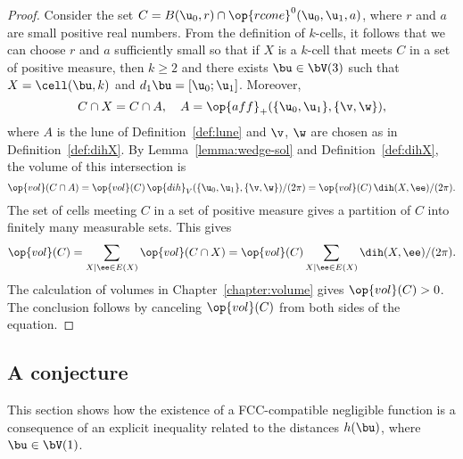 \begin{proof} 
  Consider the set $C=B(\u_0,r)\cap \op{rcone}^0(\u_0,\u_1,a)$, where
  $r$ and $a$ are small positive real numbers.  From the definition of
  $k$-cells, it follows that we can choose $r$ and $a$ sufficiently
  small so that if $X$ is a $k$-cell that meets $C$ in a set of
  positive measure, then $k\ge 2$ and there exists $\bu\in \bV(3)$
  such that $X=\cell(\bu,k)$ and $d_1\bu=[\u_0;\u_1]$.  Moreover,
\[
C\cap X = C\cap A, \quad A=\op{aff}_+(\{\u_0,\u_1\},\{\v,\w\}),
\]
where $A$ is the lune of Definition~\ref{def:lune} and $\v$, $\w$ are
chosen as in Definition~\ref{def:dihX}.  By
Lemma~\ref{lemma:wedge-sol} and Definition~\ref{def:dihX}, the volume
of this intersection is
\[
\op{vol}(C\cap A) = \op{vol}(C)\,
 {\op{dih}_V(\{\u_0,\u_1\},\{\v,\w\}) }/{(2\pi)} =
  \op{vol}(C)\, {\dih(X,\ee)}/{(2\pi)}.
\]
The set of cells meeting $C$ in a set of positive measure gives a 
partition of $C$ into finitely many measurable sets.
This gives
\[
\op{vol}(C) = \sum_{X\mid \ee\in E(X)} \op{vol}(C\cap X)  = 
\op{vol}(C)\sum_{X\mid \ee\in E(X)} \dih(X,\ee)/(2\pi).
\]
The calculation of volumes in Chapter~\ref{chapter:volume} gives
$\op{vol}(C)>0$.  The conclusion follows by canceling $\op{vol}(C)$
from both sides of the equation.
\end{proof}







\subsection{A conjecture}

This section shows how the existence of a FCC-compatible negligible
function is a consequence of an explicit
inequality related to the distances $h(\bu)$, where $\bu\in \bV(1)$.

